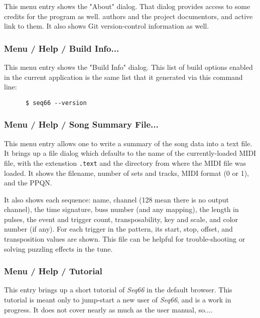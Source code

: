    This menu entry shows the "About" dialog.
   That dialog provides access to some credits for the program as well.
   authors and the project documentors, and active link to them.
   It also shows Git version-control information as well.

\subsubsection{Menu / Help / Build Info...}
\label{subsubsec:menu_help_build_info}

   This menu entry shows the "Build Info" dialog.  This list of
   build options enabled in the current application is the same list
   that it generated via this command line:

   \begin{verbatim}
      $ seq66 --version
   \end{verbatim}

\subsubsection{Menu / Help / Song Summary File...}
\label{subsubsec:menu_help_song_summary_file}

   This menu entry allows one to write a summary of the song data into a text
   file. It brings up a file dialog which defaults to the name of the
   currently-loaded MIDI file, with the extenstion \texttt{.text} and
   the directory from where the MIDI file was loaded.
   It shows the filename, number of sets and tracks, MIDI format (0 or 1),
   and the PPQN.

   It also shows each sequence: name, channel (128 mean there is no output
   channel), the time signature, buss number (and any mapping), the length in
   pulses, the event and trigger count, transposability, key and scale, and
   color number (if any).
   For each trigger in the pattern, its start, stop, offset, and transposition
   values are shown.
   This file can be helpful for trouble-shooting or solving puzzling effects in
   the tune.

\subsubsection{Menu / Help / Tutorial}
\label{subsubsec:menu_help_tutorial}

   This entry brings up a short tutorial of \textsl{Seq66} in the default
   browser. This tutorial is meant only to jump-start a new user of
   \textsl{Seq66}, and is a work in progress.
   It does not cover nearly as much as the user manual, so....

